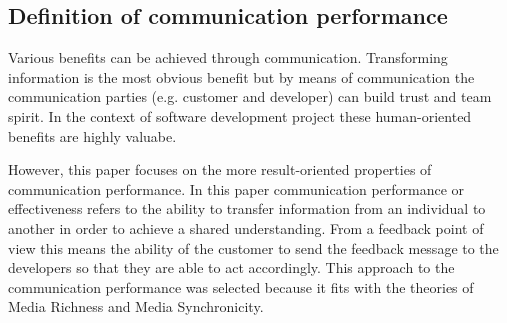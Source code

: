 \documentclass[conference]{IEEEtran}
\begin{document}
\subsection{Definition of communication performance}

Various benefits can be achieved through communication. Transforming information is the most obvious benefit but by means of communication the communication parties (e.g. customer and developer) can build trust and team spirit. In the context of software development project these human-oriented benefits are highly valuabe.

However, this paper focuses on the more result-oriented properties of communication performance. In this paper communication performance or effectiveness refers to the ability to transfer information from an individual to another in order to achieve a shared understanding. From a feedback point of view this means the ability of the customer to send the feedback message to the developers so that they are able to act accordingly. This approach to the communication performance was selected because it fits with the theories of Media Richness and Media Synchronicity.
\end{document}
